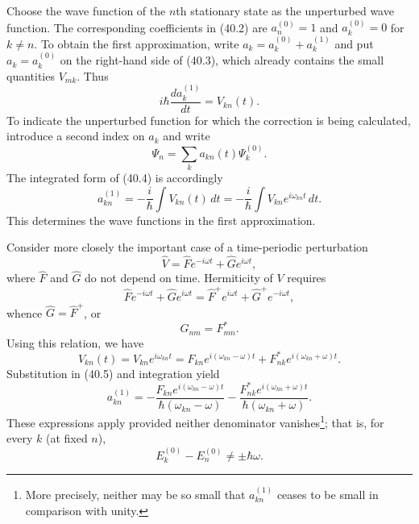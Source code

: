 Choose the wave function of the $n$th stationary state as the unperturbed
wave function. The corresponding coefficients in (40.2) are
$a_n^{(0)}=1$ and $a_k^{(0)}=0$ for $k\ne n$. To obtain the first
approximation, write $a_k=a_k^{(0)}+a_k^{(1)}$ and put
$a_k=a_k^{(0)}$ on the right-hand side of (40.3), which already contains the
small quantities $V_{mk}$. Thus
\begin{equation}
  i\hbar\frac{da_k^{(1)}}{dt}=V_{kn}(t).
  \tag{40.4}
\end{equation}
To indicate the unperturbed function for which the correction is being
calculated, introduce a second index on $a_k$ and write
\[
  \Psi_n=\sum_k a_{kn}(t)\Psi_k^{(0)}.
\]
The integrated form of (40.4) is accordingly
\begin{equation}
  a_{kn}^{(1)}=-\frac{i}{\hbar}\int V_{kn}(t)\,dt
  =-\frac{i}{\hbar}\int V_{kn}e^{i\omega_{kn}t}\,dt.
  \tag{40.5}
\end{equation}
This determines the wave functions in the first approximation.

Consider more closely the important case of a time-periodic perturbation
\begin{equation}
  \hat V=\hat F e^{-i\omega t}+\hat G e^{i\omega t},
  \tag{40.6}
\end{equation}
where $\hat F$ and $\hat G$ do not depend on time. Hermiticity of $V$ requires
\[
  \hat F e^{-i\omega t}+\hat G e^{i\omega t}
  =\hat F^{+}e^{i\omega t}+\hat G^{+}e^{-i\omega t},
\]
whence $\hat G=\hat F^{+}$, or
\begin{equation}
  G_{nm}=F_{mn}^{*}.
  \tag{40.7}
\end{equation}
Using this relation, we have
\begin{equation}
  V_{kn}(t)=V_{kn}e^{i\omega_{kn}t}
  =F_{kn}e^{i(\omega_{kn}-\omega)t}
  +F_{nk}^{*}e^{i(\omega_{kn}+\omega)t}.
  \tag{40.8}
\end{equation}
Substitution in (40.5) and integration yield
\begin{equation}
  a_{kn}^{(1)}
  =-\frac{F_{kn}e^{i(\omega_{kn}-\omega)t}}
           {\hbar(\omega_{kn}-\omega)}
   -\frac{F_{nk}^{*}e^{i(\omega_{kn}+\omega)t}}
           {\hbar(\omega_{kn}+\omega)}.
  \tag{40.9}
\end{equation}
These expressions apply provided neither denominator vanishes\footnote{More
precisely, neither may be so small that $a_{kn}^{(1)}$ ceases to be small in
comparison with unity.}; that is, for every $k$ (at fixed $n$),
\begin{equation}
  E_k^{(0)}-E_n^{(0)}\ne\pm\hbar\omega.
  \tag{40.10}
\end{equation}

